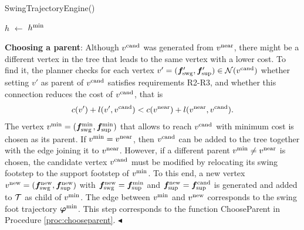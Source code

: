 \begin{procedure}%
	\small
	\removelatexerror
	
	\caption{SwingTrajectoryEngine()}
	\label{proc:genswgtraj}

    \BlankLine

	$h$ $\leftarrow$ $h^{\rm min}$\;
	
			
	\Return{$\emptyset$}\;	
\end{procedure}

{\bf Choosing a parent}: Although $v^{\rm cand}$ was generated from $v^{\rm near}$, there might be a different vertex in the tree that leads to the same vertex with a lower cost. To find it, the planner checks for each vertex $v' = ({\bm{f}}'_{\rm swg}, {\bm{f}}'_{\rm sup})\in {\cal N} (v^{\rm cand})$ whether setting $v'$ as parent of $v^{\rm cand}$ satisfies requirements R2-R3, and whether this connection reduces the cost of $v^{\rm cand}$, that is 
\[
c(v') + l(v', v^{\rm cand}) < c(v^{\rm near}) + l(v^{\rm near}, v^{\rm cand}).
\]
The vertex $v^{\rm min} = ({\bm{f}}_{\rm swg}^{\rm min}, {\bm{f}}_{\rm sup}^{\rm min})$ that allows to reach $v^{\rm cand}$ with minimum cost is chosen as its parent. If $v^{\rm min} = v^{\rm near}$, then $v^{\rm cand}$ can be added to the tree together with the edge joining it to $v^{\rm near}$. However, if a different parent $v^{\rm min} \neq v^{\rm near}$ is chosen, the candidate vertex $v^{\rm cand}$ must be modified by relocating its swing footstep to the support footstep of $v^{\rm min}$.
To this end, a new vertex $v^{\rm new} = ({\bm{f}}_{\rm swg}^{\rm new}, {\bm{f}}_{\rm sup}^{\rm new})$ with ${\bm{f}}_{\rm swg}^{\rm new} = {\bm{f}}_{\rm sup}^{\rm min}$ and ${\bm{f}}_{\rm sup}^{\rm new} = {\bm{f}}_{\rm sup}^{\rm cand}$ is generated and added to ${\cal T}$ as child of $v^{\rm min}$. The edge between $v^{\rm min}$ and $v^{\rm new}$ corresponds to the swing foot trajectory ${\bm{\varphi}}^{\rm min}$. 
This step corresponds to the function ChooseParent in Procedure \ref{proc:chooseparent}.
\hfill $\blacktriangleleft$

